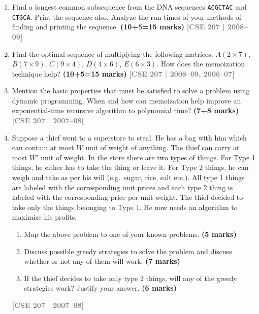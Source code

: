\documentclass[12pt,a3paper]{article}
\newcommand{\yr}[1]{\hfill\textcolor{gray}{\small\textbf{[#1]}}}
\newcommand{\mk}[1]{\textcolor{orange!70!black}{\small\textbf{(#1 marks)}}}
\begin{document}
\begin{enumerate}
\item Find a longest common subsequence from the DNA sequences \texttt{ACGCTAC} and \texttt{CTGCA}. Print the sequence also. Analyze the run times of your methods of finding and printing the sequence. \mk{10+5=15}
\yr{CSE 207 | 2008--09}

\item Find the optimal sequence of multiplying the following matrices: $A(2\times7)$, $B(7\times9)$, $C(9\times4)$, $D(4\times6)$, $E(6\times3)$. How does the memoization technique help? \mk{10+5=15}
\yr{CSE 207 | 2008--09, 2006--07}

\item Mention the basic properties that must be satisfied to solve a problem using dynamic programming. When and how can memoization help improve an exponential-time recursive algorithm to polynomial time? \mk{7+8}
\yr{CSE 207 | 2007--08}

\item Suppose a thief went to a superstore to steal. He has a bag with him which can contain at most $W$ unit of weight of anything. The thief can carry at most $W'$ unit of weight. In the store there are two types of things. For Type 1 things, he either has to take the thing or leave it. For Type 2 things, he can weigh and take as per his will (e.g.\ sugar, rice, salt etc.). All type 1 things are labeled with the corresponding unit prices and each type 2 thing is labeled with the corresponding price per unit weight. The thief decided to take only the things belonging to Type 1. He now needs an algorithm to maximize his profits.
\begin{enumerate}
  \item Map the above problem to one of your known problems. \mk{5}
  \item Discuss possible greedy strategies to solve the problem and discuss whether or not any of them will work. \mk{7}
  \item If the thief decides to take only type 2 things, will any of the greedy strategies work? Justify your answer. \mk{6}
\end{enumerate}

\yr{CSE 207 | 2007--08}


\end{enumerate}
\end{document}
